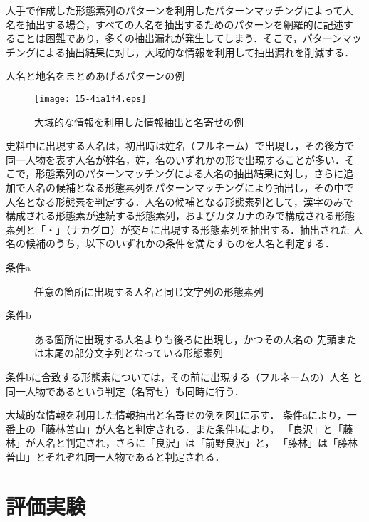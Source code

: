 \documentclass[japanese]{jnlp_1.4}
\begin{document}
人手で作成した形態素列のパターンを利用したパターンマッチングによって人
名を抽出する場合，すべての人名を抽出するためのパターンを網羅的に記述す
ることは困難であり，多くの抽出漏れが発生してしまう．そこで，パターンマッ
チングによる抽出結果に対し，大域的な情報を利用して抽出漏れを削減する．

\begin{table}[b]
\caption{人名と地名をまとめあげるパターンの例}
\label{table:pattern}
\begin{center}

\end{center}
\end{table}
\begin{figure}[b]
\begin{center}
\texttt{[image: 15-4ia1f4.eps]}
\caption{大域的な情報を利用した情報抽出と名寄せの例}
\label{fig:global}
\end{center}
\end{figure}


史料中に出現する人名は，初出時は姓名（フルネーム）で出現し，その後方で
同一人物を表す人名が姓名，姓，名のいずれかの形で出現することが多い．そ
こで，形態素列のパターンマッチングによる人名の抽出結果に対し，さらに追
加で人名の候補となる形態素列をパターンマッチングにより抽出し，その中で
人名となる形態素を判定する．人名の候補となる形態素列として，漢字のみで
構成される形態素が連続する形態素列，およびカタカナのみで構成される形態
素列と「・」（ナカグロ）が交互に出現する形態素列を抽出する．抽出された
人名の候補のうち，以下のいずれかの条件を満たすものを人名と判定する．

\begin{description}
\item[条件a] 任意の箇所に出現する人名と同じ文字列の形態素列
\item[条件b] ある箇所に出現する人名よりも後ろに出現し，かつその人名の
先頭または末尾の部分文字列となっている形態素列
\end{description}

条件bに合致する形態素については，その前に出現する（フルネームの）人名
と同一人物であるという判定（名寄せ）も同時に行う．

大域的な情報を利用した情報抽出と名寄せの例を図\ref{fig:global}に示す．
条件aにより，一番上の「藤林普山」が人名と判定される．また条件bにより，
「良沢」と「藤林」が人名と判定され，さらに「良沢」は「前野良沢」と，
「藤林」は「藤林普山」とそれぞれ同一人物であると判定される．



\section{評価実験}
\end{document}
